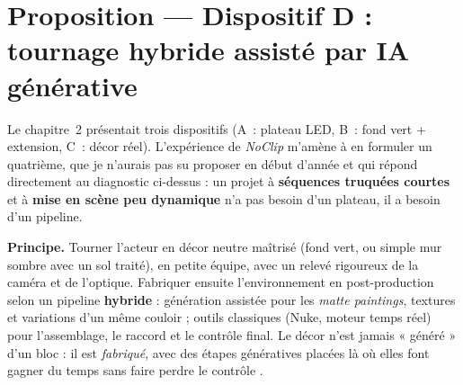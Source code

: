 \documentclass[11pt,a4paper]{report}
\begin{document}
\section{Proposition --- Dispositif D : tournage hybride assisté par IA générative}
Le chapitre~2 présentait trois dispositifs (A~: plateau LED, B~: fond vert + extension, C~: décor
réel). L'expérience de \textit{NoClip} m'amène à en formuler un quatrième, que je n'aurais pas su
proposer en début d'année et qui répond directement au diagnostic ci-dessus : un projet à
\textbf{séquences truquées courtes} et à \textbf{mise en scène peu dynamique} n'a pas besoin
d'un plateau, il a besoin d'un pipeline.

\begin{techbox}[title={Dispositif D --- tournage en décor neutre + fabrication du décor par génération assistée}]
\textbf{Principe.} Tourner l'acteur en décor neutre maîtrisé (fond vert, ou simple mur sombre
avec un sol traité), en petite équipe, avec un relevé rigoureux de la caméra et de l'optique.
Fabriquer ensuite l'environnement en post-production selon un pipeline \textbf{hybride} :
génération assistée pour les \emph{matte paintings}, textures et variations d'un même couloir ;
outils classiques (Nuke, moteur temps réel) pour l'assemblage, le raccord et le contrôle final.
Le décor n'est jamais « généré » d'un bloc : il est \emph{fabriqué}, avec des étapes génératives
placées là où elles font gagner du temps sans faire perdre le contrôle \autocite{ktt_supervfx2026}.
\end{techbox}
\end{document}
